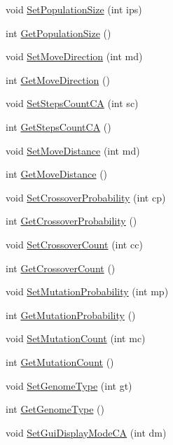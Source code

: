 \begin{DoxyCompactItemize}
\item 
void \hyperlink{classCConfigCore_a5d50ba80b386aa335876254b488911d9}{SetPopulationSize} (int ips)
\item 
int \hyperlink{classCConfigCore_af9e336726122526a8e8e84e45e21ad34}{GetPopulationSize} ()
\item 
void \hyperlink{classCConfigCore_a88d67351c9c94a3a8c95b38163958989}{SetMoveDirection} (int md)
\item 
int \hyperlink{classCConfigCore_add488b09f744e3aa3123099cb6fc0a7f}{GetMoveDirection} ()
\item 
void \hyperlink{classCConfigCore_a58e039e27357b357be539aab708c892e}{SetStepsCountCA} (int sc)
\item 
int \hyperlink{classCConfigCore_a70950ba2f607bbc8e31518f07e831aa5}{GetStepsCountCA} ()
\item 
void \hyperlink{classCConfigCore_a5d89f16000290f977b9bf33cb9f5f0ca}{SetMoveDistance} (int md)
\item 
int \hyperlink{classCConfigCore_abd32b0a6c99afe26029efe8a27590010}{GetMoveDistance} ()
\item 
void \hyperlink{classCConfigCore_aabac109d139d6511fa16e16d768af087}{SetCrossoverProbability} (int cp)
\item 
int \hyperlink{classCConfigCore_a6d6c069032db9af483f3a8c3c32fb0be}{GetCrossoverProbability} ()
\item 
void \hyperlink{classCConfigCore_ab7838b68ad921f40c57528bd1a8f62be}{SetCrossoverCount} (int cc)
\item 
int \hyperlink{classCConfigCore_a655427dab1a00f887346059ad49f4b68}{GetCrossoverCount} ()
\item 
void \hyperlink{classCConfigCore_ab71c04aaf5d5ac97aaa95dde5979e554}{SetMutationProbability} (int mp)
\item 
int \hyperlink{classCConfigCore_a0afa9032f44f906530344f1f92906567}{GetMutationProbability} ()
\item 
void \hyperlink{classCConfigCore_affbb49b26e110a803d9a2a51e14e2a92}{SetMutationCount} (int mc)
\item 
int \hyperlink{classCConfigCore_a8d88cdf520f235a366e4d7f2a5b07e8d}{GetMutationCount} ()
\item 
void \hyperlink{classCConfigCore_abcf39df8c0577d64cd2c447584e26734}{SetGenomeType} (int gt)
\item 
int \hyperlink{classCConfigCore_a10b590690cbe05c9ffd785a82937a657}{GetGenomeType} ()
\item 
void \hyperlink{classCConfigCore_aad6d7e889c24a31f738357c5bb6c11f3}{SetGuiDisplayModeCA} (int dm)

\end{DoxyCompactItemize}
